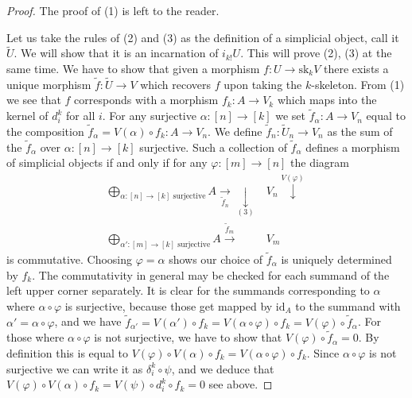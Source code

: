 \begin{proof}

The proof of (1) is left to the reader.

\medskip\noindent
Let us take the rules of (2) and (3)
as the definition of a simplicial object, call it $\tilde U$.
We will show that it is an incarnation of $i_{k!}U$.
This will prove (2), (3) at the same time. We have to show
that given a morphism $f : U \to \text{sk}_kV$
there exists a unique morphism $\tilde f : \tilde U \to V$
which recovers $f$ upon taking the $k$-skeleton.
From (1) we see that $f$ corresponds with a morphism
$f_k : A \to V_k$ which maps into the kernel of
$d^k_i$ for all $i$. For any surjective $\alpha : [n] \to [k]$
we set $\tilde f_\alpha : A \to V_n$ equal to the composition
$\tilde f_\alpha = V(\alpha) \circ f_k : A \to V_n$. We define
$\tilde f_n : \tilde U_n \to V_n$ as the sum of
the $\tilde f_\alpha$ over $\alpha : [n] \to [k]$ surjective.
Such a collection of $\tilde f_\alpha$ defines a morphism
of simplicial objects if and only if
for any $\varphi : [m] \to [n]$ the diagram
$$
\begin{array}{cc}\bigoplus_{\alpha : [n] \to [k]\text{ surjective}} A
\underset{\tilde f_n}{\longrightarrow}\underset{(3)}{\downarrow} & V_n \overset{V(\varphi)}{\downarrow} \\ \bigoplus_{\alpha' : [m] \to [k]\text{ surjective}} A
\overset{\tilde f_m}{\longrightarrow} & V_m\end{array}
$$
is commutative. Choosing $\varphi = \alpha$ shows our choice of
$\tilde f_\alpha$ is uniquely determined by $f_k$.
The commutativity in general may be checked for each summand
of the left upper corner separately. It is clear for the
summands corresponding to $\alpha$ where
$\alpha \circ \varphi$ is surjective, because those get
mapped by $\text{id}_A$ to the summand with
$\alpha' = \alpha \circ \varphi$, and we have
$\tilde f_{\alpha'} = V(\alpha') \circ f_k =
V(\alpha \circ \varphi) \circ f_k = V(\varphi) \circ \tilde f_\alpha$.
For those where $\alpha \circ \varphi$
is not surjective, we have to show that $V(\varphi) \circ \tilde f_\alpha = 0$.
By definition this is equal to
$V(\varphi) \circ V(\alpha) \circ f_k = V(\alpha \circ \varphi) \circ f_k$.
Since $\alpha \circ \varphi$ is not surjective we can write it
as $\delta^k_i \circ \psi$, and we deduce that
$V(\varphi) \circ V(\alpha) \circ f_k =
V(\psi) \circ d^k_i \circ f_k = 0$ see above.


\end{proof}
